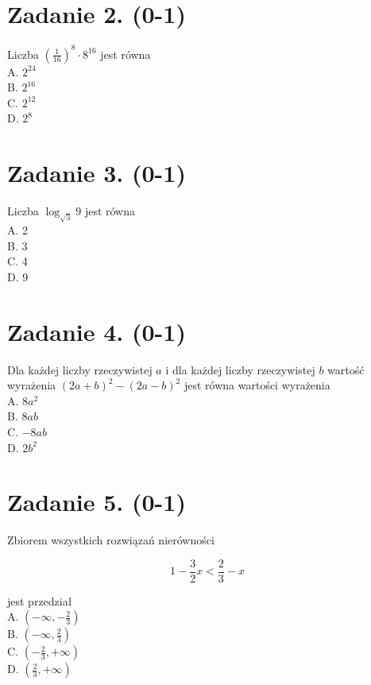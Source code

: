 \documentclass[10pt]{article}
\begin{document}
\section*{Zadanie 2. (0-1)}
Liczba \(\left(\frac{1}{16}\right)^{8} \cdot 8^{16}\) jest równa\\
A. \(2^{24}\)\\
B. \(2^{16}\)\\
C. \(2^{12}\)\\
D. \(2^{8}\)

\section*{Zadanie 3. (0-1)}
Liczba \(\log _{\sqrt{3}} 9\) jest równa\\
A. 2\\
B. 3\\
C. 4\\
D. 9

\section*{Zadanie 4. (0-1)}
Dla każdej liczby rzeczywistej \(a\) i dla każdej liczby rzeczywistej \(b\) wartość wyrażenia \((2 a+b)^{2}-(2 a-b)^{2}\) jest równa wartości wyrażenia\\
A. \(8 a^{2}\)\\
B. \(8 a b\)\\
C. \(-8 a b\)\\
D. \(2 b^{2}\)

\section*{Zadanie 5. (0-1)}
Zbiorem wszystkich rozwiązań nierówności

\[
1-\frac{3}{2} x<\frac{2}{3}-x
\]

jest przedział\\
A. \(\left(-\infty,-\frac{2}{3}\right)\)\\
B. \(\left(-\infty, \frac{2}{3}\right)\)\\
C. \(\left(-\frac{2}{3},+\infty\right)\)\\
D. \(\left(\frac{2}{3},+\infty\right)\)
\end{document}
